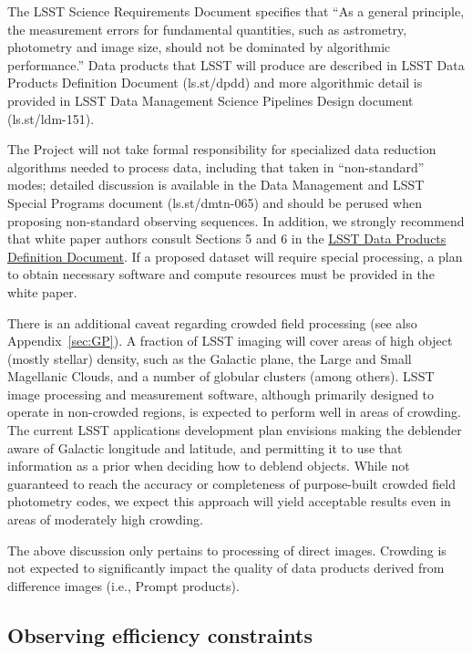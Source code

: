 \documentclass[DM,toc,usenatbib]{lsstdoc}
\begin{document}
The LSST Science Requirements Document specifies that ``As a general principle, the measurement errors
for fundamental quantities, such as astrometry, photometry and image size, should not be dominated by 
algorithmic performance.'' Data products that LSST will produce are described in LSST Data Products
Definition Document (ls.st/dpdd) and more algorithmic detail is provided in LSST Data Management 
Science Pipelines Design document (ls.st/ldm-151). 

The Project will not take formal responsibility for specialized data reduction algorithms 
needed to process data, including that taken in ``non-standard'' modes; detailed discussion is 
available in the Data Management and LSST Special Programs document (ls.st/dmtn-065) and should
be perused when proposing non-standard observing sequences. In addition, we strongly recommend 
that white paper authors consult Sections 5 and 6 in the \href{http://ls.st/dpdd}{LSST Data Products Definition Document}. If 
a proposed dataset will require special processing, a plan to obtain necessary software and compute resources 
must be provided in the white paper. 

There is an additional caveat regarding crowded field processing (see also Appendix~\ref{sec:GP}). 
A fraction of LSST imaging will cover areas of high object (mostly stellar) density, such as the 
Galactic plane, the Large and Small Magellanic Clouds, and a number of globular clusters (among 
others). LSST image processing and measurement software, although primarily designed to operate 
in non-crowded regions, is expected to perform well in areas of crowding. The current LSST applications 
development plan envisions making the deblender aware of Galactic longitude and latitude, and 
permitting it to use that information as a prior when deciding how to deblend objects. While not 
guaranteed to reach the accuracy or completeness of purpose-built crowded field photometry codes, 
we expect this approach will yield acceptable results even in areas of moderately high crowding.

The above discussion only pertains to processing of direct images. Crowding is not expected to 
significantly impact the quality of data products derived from difference images (i.e., Prompt 
products).


\subsection{Observing efficiency constraints} 
\end{document}
